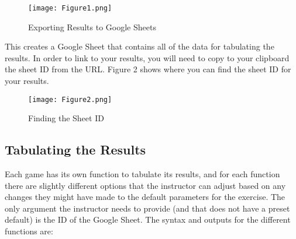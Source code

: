 \documentclass[
]{article}
\begin{document}
\begin{figure}
\centering
\texttt{[image: Figure1.png]}
\caption{Exporting Results to Google Sheets}
\end{figure}

This creates a Google Sheet that contains all of the data for tabulating
the results. In order to link to your results, you will need to copy to
your clipboard the sheet ID from the URL. Figure 2 shows where you can
find the sheet ID for your results.

\begin{figure}
\centering
\texttt{[image: Figure2.png]}
\caption{Finding the Sheet ID}
\end{figure}

\hypertarget{tabulating-the-results}{%
\subsection{Tabulating the Results}\label{tabulating-the-results}}

Each game has its own function to tabulate its results, and for each
function there are slightly different options that the instructor can
adjust based on any changes they might have made to the default
parameters for the exercise. The only argument the instructor needs to
provide (and that does not have a preset default) is the ID of the
Google Sheet. The syntax and outputs for the different functions are:
\end{document}
